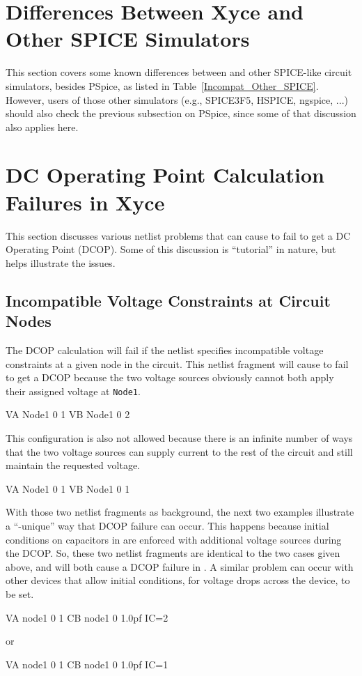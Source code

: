 \section{Differences Between Xyce and Other SPICE Simulators}
This section covers some known differences between \Xyce{} and other SPICE-like
circuit simulators, besides PSpice, as listed in Table~\ref{Incompat_Other_SPICE}.
However, users of those other simulators (e.g., SPICE3F5, HSPICE, ngspice, ...)
should also check the previous subsection on PSpice, since some of that
discussion also applies here.

  

\section{DC Operating Point Calculation Failures in Xyce}
This section discusses various netlist problems that can cause \Xyce{} to 
fail to get a DC Operating Point (DCOP).  Some of this discussion is
``tutorial'' in nature, but helps illustrate the issues.

\subsection{Incompatible Voltage Constraints at Circuit Nodes}
The \Xyce{} DCOP calculation will fail if the netlist specifies incompatible voltage
constraints at a given node in the circuit.  This netlist fragment will cause \Xyce{} 
to fail to get a DCOP because the two voltage sources obviously cannot both apply 
their assigned voltage at \texttt{Node1}.
\begin{vquote}
VA Node1 0 1
VB Node1 0 2
\end{vquote}
This configuration is also not allowed because there is an infinite number of ways that
the two voltage sources can supply current to the rest of the circuit and still maintain
the requested voltage.
\begin{vquote}
VA Node1 0 1
VB Node1 0 1
\end{vquote}
With those two netlist fragments as background, the next two examples illustrate 
a ``\Xyce{}-unique'' way that DCOP failure can occur.  This happens because initial 
conditions on capacitors in \Xyce{} are enforced with additional voltage sources
during the DCOP.  So, these two netlist fragments are identical to the two cases 
given above, and will both cause a DCOP failure in \Xyce{}.  A similar problem can
occur with other \Xyce{} devices that allow initial conditions, for voltage drops across
the device, to be set.
\begin{vquote}
VA node1 0 1
CB node1 0 1.0pf IC=2
\end{vquote}
or
\begin{vquote}
VA node1 0 1
CB node1 0 1.0pf IC=1
\end{vquote}
